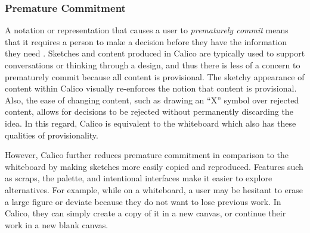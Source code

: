 \documentclass[12pt,fleqn]{ucithesis}
\begin{document}
\subsubsection{Premature Commitment}
A notation or representation that causes a user to \textit{prematurely commit} means that it requires a person to make a decision before they have the information they need \cite{Petre2013BookChapter}. Sketches and content produced in Calico are typically used to support conversations or thinking through a design, and thus there is less of a concern to prematurely commit because all content is provisional. The sketchy appearance of content within Calico visually re-enforces the notion that content is provisional. Also, the ease of changing content, such as drawing an ``X'' symbol over rejected content, allows for decisions to be rejected without permanently discarding the idea. In this regard, Calico is equivalent to the whiteboard which also has these qualities of provisionality. 

However, Calico further reduces premature commitment in comparison to the whiteboard by making sketches more easily copied and reproduced. Features such as scraps, the palette, and intentional interfaces make it easier to explore alternatives. For example, while on a whiteboard, a user may be hesitant to erase a large figure or deviate because they do not want to lose previous work. In Calico, they can simply create a copy of it in a new canvas, or continue their work in a new blank canvas.


\end{document}
